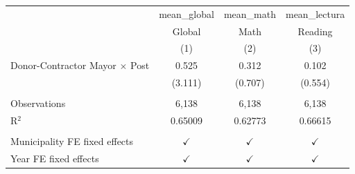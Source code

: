
\begingroup
\centering
\begin{tabular}{lccc}
   \toprule
                                         & mean\_global  & mean\_math    & mean\_lectura\\   
                                         & Global        & Math          & Reading \\   
                                         & (1)           & (2)           & (3)\\  
   \midrule 
   Donor-Contractor Mayor $\times$ Post  & 0.525         & 0.312         & 0.102\\   
                                         & (3.111)       & (0.707)       & (0.554)\\   
    \\
   Observations                          & 6,138         & 6,138         & 6,138\\  
   R$^2$                                 & 0.65009       & 0.62773       & 0.66615\\  
    \\
   Municipality FE fixed effects         & $\checkmark$  & $\checkmark$  & $\checkmark$\\   
   Year FE fixed effects                 & $\checkmark$  & $\checkmark$  & $\checkmark$\\   
   \bottomrule
\end{tabular}
\par\endgroup


